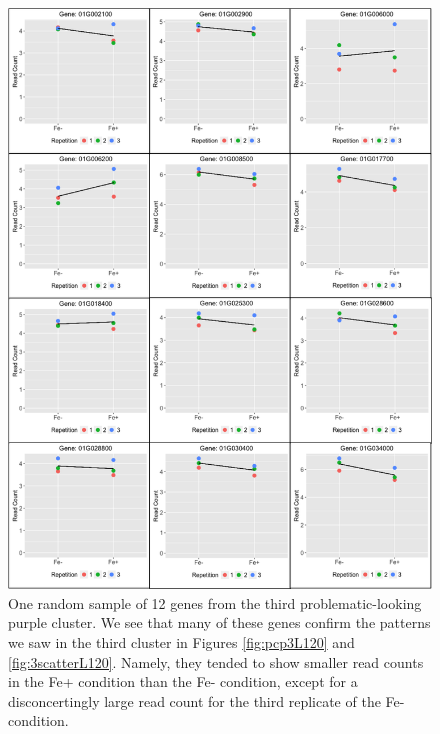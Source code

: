 \documentclass[11pt,a4paper,oldfontcommands,openany]{memoir}
\numberwithin{equation}{section} %
\begin{document}
\begin{figure}[H]
  \centering
  \includegraphics[width=\textwidth]{indSBGenes1}
  \caption{One random sample of 12 genes from the third problematic-looking purple cluster. We see that many of these genes confirm the patterns we saw in the third cluster in Figures \ref{fig:pcp3L120} and \ref{fig:3scatterL120}. Namely, they tended to show smaller read counts in the Fe+ condition than the Fe- condition, except for a disconcertingly large read count for the third replicate of the Fe- condition.}
  \label{fig:indSBGenes1}
\end{figure}
\end{document}
